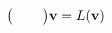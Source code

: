 \documentclass[preview]{standalone}
\begin{document}
\begin{align*}
\big( \hphantom{u_x} \hphantom{u_y} \big) \mathbf{v} = L ( \mathbf{v} )
\end{align*}
\end{document}
